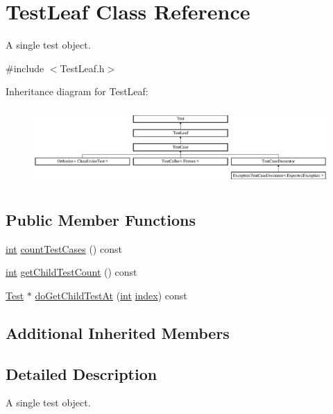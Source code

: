 \hypertarget{class_test_leaf}{\section{Test\-Leaf Class Reference}
\label{class_test_leaf}
}


A single test object.  




{\ttfamily \#include $<$Test\-Leaf.\-h$>$}

Inheritance diagram for Test\-Leaf\-:\begin{figure}[H]
\begin{center}
\leavevmode
\includegraphics[height=2.962963cm]{class_test_leaf}
\end{center}
\end{figure}
\subsection*{Public Member Functions}
\begin{DoxyCompactItemize}
\item 
\hyperlink{wglew_8h_a500a82aecba06f4550f6849b8099ca21}{int} \hyperlink{class_test_leaf_aecf22f6d00f9a35d89c00c4b83e34aff}{count\-Test\-Cases} () const 
\item 
\hyperlink{wglew_8h_a500a82aecba06f4550f6849b8099ca21}{int} \hyperlink{class_test_leaf_a74463f8aa3dae0f727f26a184233749a}{get\-Child\-Test\-Count} () const 
\item 
\hyperlink{class_test}{Test} $\ast$ \hyperlink{class_test_leaf_ac6c850de11b23821255839205fb319d5}{do\-Get\-Child\-Test\-At} (\hyperlink{wglew_8h_a500a82aecba06f4550f6849b8099ca21}{int} \hyperlink{fmod__codec_8h_a57f14e05b1900f16a2da82ade47d0c6d}{index}) const 
\end{DoxyCompactItemize}
\subsection*{Additional Inherited Members}


\subsection{Detailed Description}
A single test object. 

